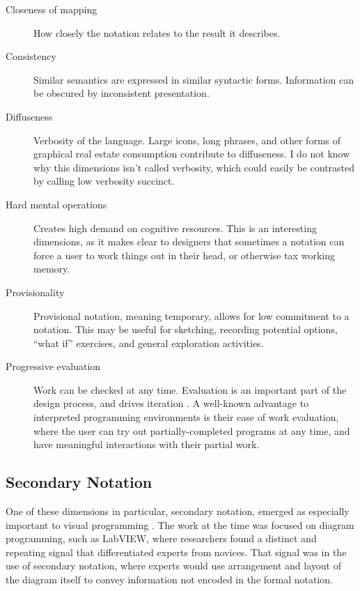\begin{description}
\item [Closeness of mapping] How closely the notation relates to the result it describes. 
\item [Consistency] Similar semantics are expressed in similar syntactic forms. Information can be obscured by inconsistent presentation.
\item [Diffuseness] Verbosity of the language. Large icons, long phrases, and other forms of graphical real estate consumption contribute to diffuseness. I do not know why this dimensions isn't called verbosity, which could easily be contrasted by calling low verbosity succinct.
\item [Hard mental operations] Creates high demand on cognitive resources. This is an interesting dimensions, as it makes clear to designers that sometimes a notation can force a user to work things out in their head, or otherwise tax working memory.
\item [Provisionality] Provisional notation, meaning temporary, allows for low commitment to a notation. This may be useful for sketching, recording potential options, ``what if'' exercises, and general exploration activities.
\item [Progressive evaluation] Work can be checked at any time. Evaluation is an important part of the design process, and drives iteration \citep{atman-2003}. A well-known advantage to interpreted programming environments is their ease of work evaluation, where the user can try out partially-completed programs at any time, and have meaningful interactions with their partial work.
\end{description}

\subsection{Secondary Notation}
One of these dimensions in particular, secondary notation, emerged as especially important to visual programming \citep{petre-2006}. The work at the time was focused on diagram programming, such as LabVIEW, where researchers found a distinct and repeating signal that differentiated experts from novices. That signal was in the use of secondary notation, where experts would use arrangement and layout of the diagram itself to convey information not encoded in the formal notation. 

